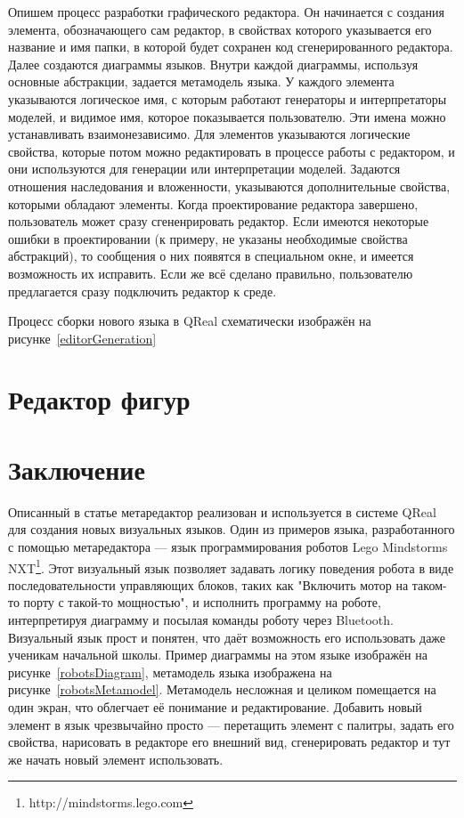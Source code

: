 \documentclass[a4paper]{article}
\begin{document}
Опишем процесс разработки графического редактора. Он начинается с создания элемента, обозначающего сам редактор, в свойствах которого указывается его название и имя папки, в которой будет сохранен код сгенерированного редактора. Далее создаются диаграммы языков. Внутри каждой диаграммы, используя основные абстракции, задается метамодель языка. У каждого элемента указываются логическое имя, с которым работают генераторы и интерпретаторы моделей, и видимое имя, которое показывается пользователю. Эти имена можно устанавливать взаимонезависимо. Для элементов указываются логические свойства, которые потом можно редактировать в процессе работы с редактором, и они используются для генерации или интерпретации моделей. Задаются отношения наследования и вложенности, указываются дополнительные свойства, которыми обладают элементы. Когда проектирование редактора завершено, пользователь может сразу сгененрировать редактор. Если имеются некоторые ошибки в проектировании (к примеру, не указаны необходимые свойства абстракций), то сообщения о них появятся в специальном окне, и имеется возможность их исправить. Если же всё сделано правильно, пользователю предлагается сразу подключить редактор к среде.  

Процесс сборки нового языка в QReal схематически изображён на рисунке~\ref{editorGeneration}

\section{Редактор фигур}

\section{Заключение}
Описанный в статье метаредактор реализован и используется в системе QReal для создания новых визуальных языков. Один из примеров языка, разработанного с помощью метаредактора --- язык программирования роботов Lego Mindstorms NXT\footnote{http://mindstorms.lego.com}. Этот визуальный язык позволяет задавать логику поведения робота в виде последовательности управляющих блоков, таких как "Включить мотор на таком-то порту с такой-то мощностью", и исполнить программу на роботе, интерпретируя диаграмму и посылая команды роботу через Bluetooth. Визуальный язык прост и понятен, что даёт возможность его использовать даже ученикам начальной школы. Пример диаграммы на этом языке изображён на рисунке~\ref{robotsDiagram}, метамодель языка изображена на рисунке~\ref{robotsMetamodel}. Метамодель несложная и целиком помещается на один экран, что облегчает её понимание и редактирование. Добавить новый элемент в язык чрезвычайно просто --- перетащить элемент с палитры, задать его свойства, нарисовать в редакторе его внешний вид, сгенерировать редактор и тут же начать новый элемент использовать.
\end{document}
